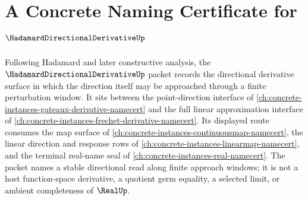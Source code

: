 \chapter{A Concrete Naming Certificate for $\HadamardDirectionalDerivativeUp$}
\label{ch:concrete-instances-hadamard-directional-derivative-namecert}

Following Hadamard and later constructive analysis, the $\HadamardDirectionalDerivativeUp$ packet records the directional derivative surface in which the direction itself may be approached through a finite perturbation window. It sits between the point-direction interface of \autoref{ch:concrete-instances-gateaux-derivative-namecert} and the full linear approximation interface of \autoref{ch:concrete-instances-frechet-derivative-namecert}. Its displayed route consumes the map surface of \autoref{ch:concrete-instances-continuousmap-namecert}, the linear direction and response rows of \autoref{ch:concrete-instances-linearmap-namecert}, and the terminal real-name seal of \autoref{ch:concrete-instances-real-namecert}. The packet names a stable directional read along finite approach windows; it is not a host function-space derivative, a quotient germ equality, a selected limit, or ambient completeness of $\RealUp$.

